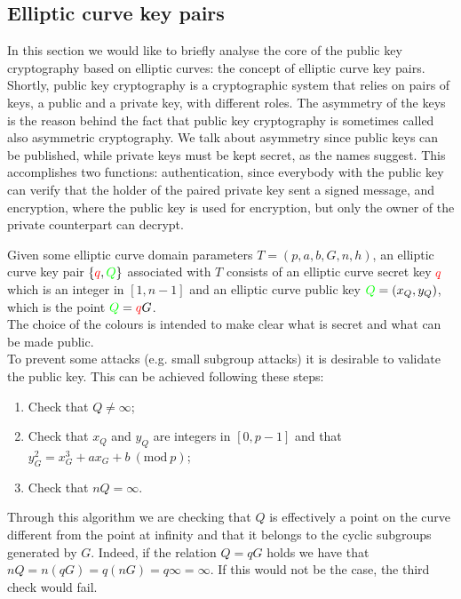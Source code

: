 \subsection{Elliptic curve key pairs}
\label{keypairs}
In this section we would like to briefly analyse the core of the public key cryptography based on elliptic curves: the concept of elliptic curve key pairs. Shortly, public key cryptography is a cryptographic system that relies on pairs of keys, a public and a private key, with different roles. The asymmetry of the keys is the reason behind the fact that public key cryptography is sometimes called also asymmetric cryptography. We talk about asymmetry since public keys can be published, while private keys must be kept secret, as the names suggest. This accomplishes two functions: authentication, since everybody with the public key can verify that the holder of the paired private key sent a signed message, and encryption, where the public key is used for encryption, but only the owner of the private counterpart can decrypt.

\bigskip
\noindent
Given some elliptic curve domain parameters $T = (p, a, b, G, n, h)$, an elliptic curve key pair $\{\textcolor{red}{q}, \textcolor{green}{Q}\}$ associated with $T$ consists of an elliptic curve secret key $\textcolor{red}{q}$ which is an integer in $[1, n - 1]$ and an elliptic curve public key $\textcolor{green}{Q} = (x_Q, y_Q)$, which is the point $\textcolor{green}{Q} = \textcolor{red}{q}G$.
\\
The choice of the colours is intended to make clear what is secret and what can be made public.
\\
To prevent some attacks (e.g. small subgroup attacks) it is desirable to validate the public key. This can be achieved following these steps:
\begin{enumerate}
	\item Check that $Q \neq \infty$;
	\item Check that $x_Q$ and $y_Q$ are integers in $[0, p - 1]$ and that $y_G^2 = x_G^3 + ax_G + b \ (\text{mod} \ p)$;
	\item Check that $nQ = \infty$.
\end{enumerate}
Through this algorithm we are checking that $Q$ is effectively a point on the curve different from the point at infinity and that it belongs to the cyclic subgroups generated by $G$. Indeed, if the relation $Q = qG$ holds we have that $nQ = n(qG) = q(nG) = q\infty = \infty$. If this would not be the case, the third check would fail.

